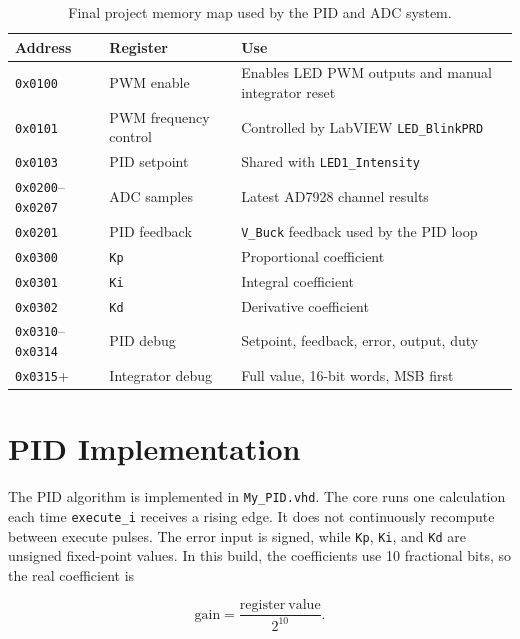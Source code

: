 \documentclass[12pt]{article}
\begin{document}
\begin{table}[H]
  \centering
  \caption{Final project memory map used by the PID and ADC system.}
  \label{tab:memory-map}
  \begin{tabular}{lll}
    \toprule
    Address & Register & Use \\
    \midrule
    \texttt{0x0100} & PWM enable & Enables LED PWM outputs and manual integrator reset \\
    \texttt{0x0101} & PWM frequency control & Controlled by LabVIEW \texttt{LED\_BlinkPRD} \\
    \texttt{0x0103} & PID setpoint & Shared with \texttt{LED1\_Intensity} \\
    \texttt{0x0200}--\texttt{0x0207} & ADC samples & Latest AD7928 channel results \\
    \texttt{0x0201} & PID feedback & \texttt{V\_Buck} feedback used by the PID loop \\
    \texttt{0x0300} & \texttt{Kp} & Proportional coefficient \\
    \texttt{0x0301} & \texttt{Ki} & Integral coefficient \\
    \texttt{0x0302} & \texttt{Kd} & Derivative coefficient \\
    \texttt{0x0310}--\texttt{0x0314} & PID debug & Setpoint, feedback, error, output, duty \\
    \texttt{0x0315}+ & Integrator debug & Full value, 16-bit words, MSB first \\
    \bottomrule
  \end{tabular}
\end{table}

\section*{PID Implementation}

The PID algorithm is implemented in \texttt{My\_PID.vhd}. The core runs one calculation each time \texttt{execute\_i} receives a rising edge. It does not continuously recompute between execute pulses. The error input is signed, while \texttt{Kp}, \texttt{Ki}, and \texttt{Kd} are unsigned fixed-point values. In this build, the coefficients use 10 fractional bits, so the real coefficient is

\begin{equation}
  \mathrm{gain} = \frac{\mathrm{register\ value}}{2^{10}}.
\end{equation}
\end{document}
